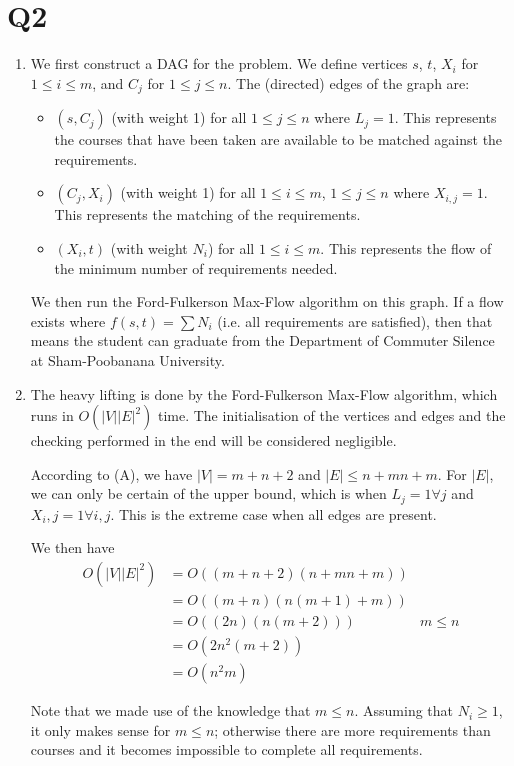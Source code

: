 \documentclass[12pt,a4paper]{article}
\begin{document}
\section*{Q2}
	\begin{enumerate}[label=(\Alph*)]
		\item 
		We first construct a DAG for the problem.
		We define vertices $s$, $t$, $X_i$ for $1 \le i \le m$, and $C_j$ for $1 \le j \le n$.
		The (directed) edges of the graph are:
		\begin{itemize}
			\item $(s, C_j)$ (with weight 1) for all $1 \le j \le n$ where $L_j = 1$. This represents the courses that have been taken are available to be matched against the requirements.
			\item $(C_j, X_i)$ (with weight 1) for all $1 \le i \le m$, $1 \le j \le n$ where $X_{i,j} = 1$. This represents the matching of the requirements.
			\item $(X_i, t)$ (with weight $N_i$) for all $1 \le i \le m$. This represents the flow of the minimum number of requirements needed.
		\end{itemize}

		We then run the Ford-Fulkerson Max-Flow algorithm on this graph. If a flow exists where $f(s,t) = \sum N_i$ (i.e. all requirements are satisfied), then that means the student can graduate from the Department of Commuter Silence at Sham-Poobanana University.

		\item 
		The heavy lifting is done by the Ford-Fulkerson Max-Flow algorithm, which runs in $O(|V||E|^2)$ time. The initialisation of the vertices and edges and the checking performed in the end will be considered negligible.

		According to (A), we have $|V| = m + n + 2$ and $|E| \le n + mn + m$. For $|E|$, we can only be certain of the upper bound, which is when $L_j = 1 \forall j$ and $X_i,j = 1 \forall i,j$. This is the extreme case when all edges are present.

		We then have
		\begin{align*}
			O(|V||E|^2) &= O((m+n+2)(n+mn+m)) \\
			&= O((m+n)(n(m+1)+m)) \\
			&= O((2n)(n(m+2))) & m \le n \\
			&= O(2n^2(m+2)) \\
			&= O(n^2m)
		\end{align*}

		Note that we made use of the knowledge that $m \le n$. Assuming that $N_i \ge 1$, it only makes sense for $m \le n$; otherwise there are more requirements than courses and it becomes impossible to complete all requirements.


\end{enumerate}
\end{document}
